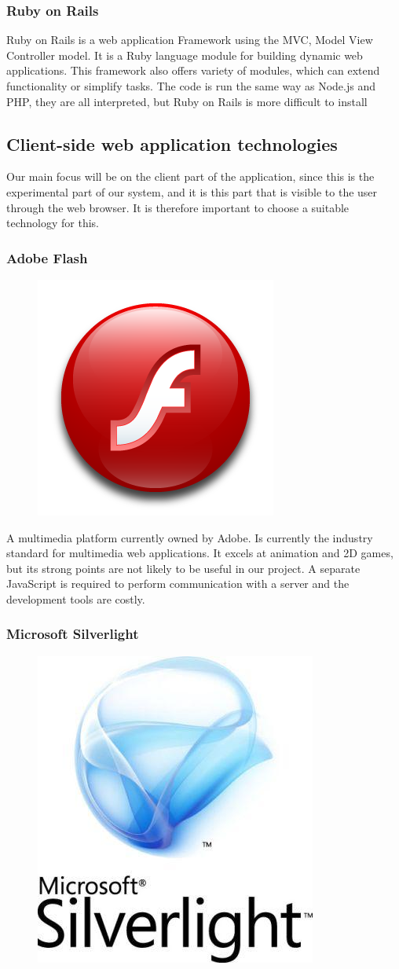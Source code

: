 \subsubsection*{Ruby on Rails}
Ruby on Rails is a web application Framework using the MVC, Model View Controller model. It is a Ruby language module for building dynamic web applications. This framework also offers variety of modules, which can extend functionality or simplify tasks. The code is run the same way as Node.js and PHP, they are all interpreted, but Ruby on Rails is more difficult to install \cite{ror-about}


\subsection{Client-side web application technologies}
Our main focus will be on the client part of the application, since this is the experimental part of our system, and it is this part that is visible to the user through the web browser. It is therefore important to choose a suitable technology for this.

\subsubsection{Adobe Flash}

\begin{figure}
\vspace{-30pt}
\centering
\includegraphics[width = .10\textwidth]{image/flash-logo.png}
\end{figure}


A multimedia platform currently owned by Adobe. Is currently the industry standard for multimedia web applications. It excels at animation and 2D games, but its strong points are not likely to be useful in our project. A separate JavaScript is required to perform communication with a server and the development tools are costly.

\subsubsection{Microsoft Silverlight}

\begin{figure}
\vspace{-47pt}
\centering
\includegraphics[width=.10\textwidth]{image/silverlight-logo.jpg}
\end{figure}


